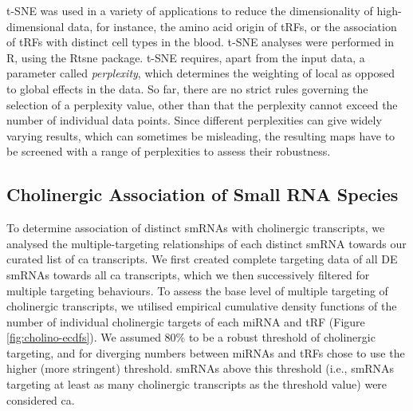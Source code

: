 \begin{method}
t-SNE was used in a variety of applications to reduce the dimensionality of high-dimensional data, for instance, the amino acid origin of tRFs, or the association of tRFs with distinct cell types in the blood. t-SNE analyses were performed in R, using the Rtsne package.\cite{Krijthe2015} t-SNE requires, apart from the input data, a parameter called \emph{perplexity}, which determines the weighting of local as opposed to global effects in the data. So far, there are no strict rules governing the selection of a perplexity value, other than that the perplexity cannot exceed the number of individual data points. Since different perplexities can give widely varying results, which can sometimes be misleading, the resulting maps have to be screened with a range of perplexities to assess their robustness.

\subsection{Cholinergic Association of Small RNA Species} \label{sec:stroke:chol-assoc}
To determine association of distinct smRNAs with cholinergic transcripts, we analysed the multiple-targeting relationships of each distinct smRNA towards our curated list of \ac{ca} transcripts. We first created complete targeting data of all DE smRNAs towards all \ac{ca} transcripts, which we then successively filtered for multiple targeting behaviours. To assess the base level of multiple targeting of cholinergic transcripts, we utilised empirical cumulative density functions of the number of individual cholinergic targets of each miRNA and tRF (Figure \ref{fig:cholino-ecdfs}). We assumed 80\% to be a robust threshold of cholinergic targeting, and for diverging numbers between miRNAs and tRFs chose to use the higher (more stringent) threshold. smRNAs above this threshold (i.e., smRNAs targeting at least as many cholinergic transcripts as the threshold value) were considered \ac{ca}.

\end{method}


